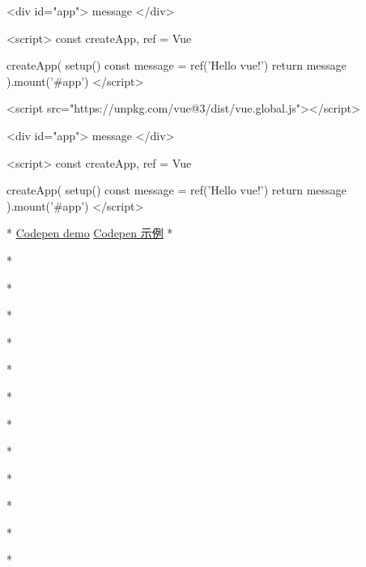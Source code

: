 \begin{paracol}{2}
\begin{codeHtml}
<div id="app">{{ message }}</div>

<script>
    const { createApp, ref } = Vue

    createApp({
    setup() {
        const message = ref('Hello vue!')
        return {
        message
        }
    }
    }).mount('#app')
</script>
\end{codeHtml}  
\switchcolumn
\begin{codeHtml}
<script src="https://unpkg.com/vue@3/dist/vue.global.js"></script>

<div id="app">{{ message }}</div>

<script>
    const { createApp, ref } = Vue

    createApp({
    setup() {
        const message = ref('Hello vue!')
        return {
        message
        }
    }
    }).mount('#app')
</script>
\end{codeHtml}
\switchcolumn[0]*%
\href{https://codepen.io/vuejs-examples/pen/eYQpQEG}{Codepen demo}
\switchcolumn
\href{https://codepen.io/vuejs-examples/pen/eYQpQEG}{Codepen 示例}
\switchcolumn[0]*%

\switchcolumn

\switchcolumn[0]*%

\switchcolumn

\switchcolumn[0]*%

\switchcolumn

\switchcolumn[0]*%

\switchcolumn

\switchcolumn[0]*%

\switchcolumn

\switchcolumn[0]*%

\switchcolumn

\switchcolumn[0]*%

\switchcolumn

\switchcolumn[0]*%

\switchcolumn

\switchcolumn[0]*%

\switchcolumn

\switchcolumn[0]*%

\switchcolumn

\switchcolumn[0]*%

\switchcolumn


\switchcolumn[0]*%

\switchcolumn


\switchcolumn[0]*%


\end{paracol}

